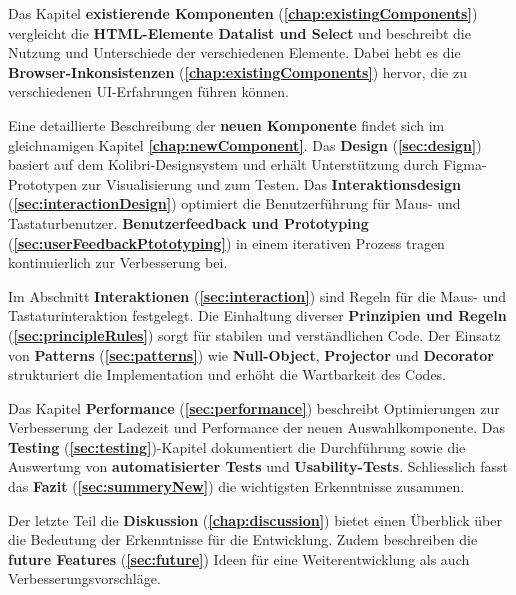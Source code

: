 Das Kapitel \textbf{existierende Komponenten} (\textbf{\ref{chap:existingComponents}}) vergleicht die \textbf{HTML-Elemente Datalist und Select} und beschreibt die Nutzung und Unterschiede der verschiedenen Elemente. 
Dabei hebt es die \textbf{Browser-Inkonsistenzen} (\textbf{\ref{chap:existingComponents}}) hervor, die zu verschiedenen UI-Erfahrungen führen können.

Eine detaillierte Beschreibung der \textbf{neuen Komponente} findet sich im gleichnamigen Kapitel \textbf{\ref{chap:newComponent}}.
Das \textbf{Design} (\textbf{\ref{sec:design}}) basiert auf dem Kolibri-Designsystem und erhält Unterstützung durch Figma-Prototypen zur Visualisierung und zum Testen.
Das \textbf{Interaktionsdesign} (\textbf{\ref{sec:interactionDesign}}) optimiert die Benutzerführung für Maus- und Tastaturbenutzer.
\textbf{Benutzerfeedback und Prototyping} (\textbf{\ref{sec:userFeedbackPtototyping}}) in einem iterativen Prozess tragen kontinuierlich zur Verbesserung bei.

Im Abschnitt \textbf{Interaktionen} (\textbf{\ref{sec:interaction}}) sind Regeln für die Maus- und Tastaturinteraktion festgelegt.
Die Einhaltung diverser \textbf{Prinzipien und Regeln} (\textbf{\ref{sec:principleRules}}) sorgt für stabilen und verständlichen Code.
Der Einsatz von \textbf{Patterns} (\textbf{\ref{sec:patterns}}) wie \textbf{Null-Object}, \textbf{Projector} und \textbf{Decorator} strukturiert die Implementation und erhöht die Wartbarkeit des Codes.

Das Kapitel \textbf{Performance} (\textbf{\ref{sec:performance}}) beschreibt Optimierungen zur Verbesserung der Ladezeit und Performance der neuen Auswahlkomponente.
Das \textbf{Testing} (\textbf{\ref{sec:testing}})-Kapitel dokumentiert die Durchführung sowie die Auswertung von \textbf{automatisierter Tests} und \textbf{Usability-Tests}.
Schliesslich fasst das \textbf{Fazit} (\textbf{\ref{sec:summeryNew}}) die wichtigsten Erkenntnisse zusammen.

Der letzte Teil die \textbf{Diskussion} (\textbf{\ref{chap:discussion}}) bietet einen Überblick über die Bedeutung der Erkenntnisse für die Entwicklung.
Zudem beschreiben die \textbf{future Features} (\textbf{\ref{sec:future}}) Ideen für eine Weiterentwicklung als auch Verbesserungsvorschläge.
